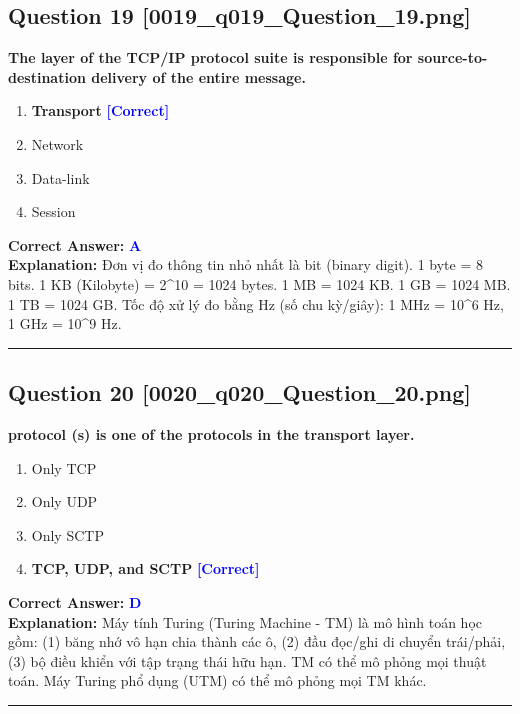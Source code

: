 \documentclass[11pt,a4paper]{article}
\begin{document}
\begin{minipage}{\textwidth}
\subsection*{Question 19 \quad \footnotesize{[0019\_q019\_Question\_19.png]}}
\noindent \textbf{The layer of the TCP/IP protocol suite is responsible for source-to-destination delivery of the entire message.}

\begin{enumerate}[label=\Alph*.]
    \item \textbf{Transport} \hfill \textcolor{blue}{\textbf{[Correct]}}
    \item Network
    \item Data-link
    \item Session
\end{enumerate}

\noindent \textbf{Correct Answer:} \textcolor{blue}{\textbf{A}} \\[2pt]
\noindent \textbf{Explanation:} Đơn vị đo thông tin nhỏ nhất là bit (binary digit). 1 byte = 8 bits. 1 KB (Kilobyte) = 2\textasciicircum{}10 = 1024 bytes. 1 MB = 1024 KB. 1 GB = 1024 MB. 1 TB = 1024 GB. Tốc độ xử lý đo bằng Hz (số chu kỳ/giây): 1 MHz = 10\textasciicircum{}6 Hz, 1 GHz = 10\textasciicircum{}9 Hz.

\par\vspace{0.3cm}
\hrule
\vspace{0.3cm}
\end{minipage}

\begin{minipage}{\textwidth}
\subsection*{Question 20 \quad \footnotesize{[0020\_q020\_Question\_20.png]}}
\noindent \textbf{protocol (s) is one of the protocols in the transport layer.}

\begin{enumerate}[label=\Alph*.]
    \item Only TCP
    \item Only UDP
    \item Only SCTP
    \item \textbf{TCP, UDP, and SCTP} \hfill \textcolor{blue}{\textbf{[Correct]}}
\end{enumerate}

\noindent \textbf{Correct Answer:} \textcolor{blue}{\textbf{D}} \\[2pt]
\noindent \textbf{Explanation:} Máy tính Turing (Turing Machine - TM) là mô hình toán học gồm: (1) băng nhớ vô hạn chia thành các ô, (2) đầu đọc/ghi di chuyển trái/phải, (3) bộ điều khiển với tập trạng thái hữu hạn. TM có thể mô phỏng mọi thuật toán. Máy Turing phổ dụng (UTM) có thể mô phỏng mọi TM khác.

\par\vspace{0.3cm}
\hrule
\vspace{0.3cm}
\end{minipage}
\end{document}
